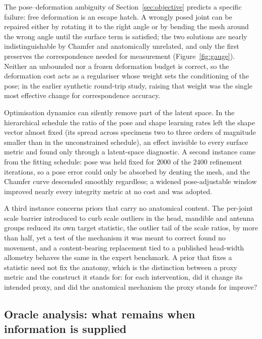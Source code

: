 The pose--deformation ambiguity of Section~\ref{sec:objective} predicts a specific
failure: free deformation is an escape hatch. A wrongly posed joint can be repaired
either by rotating it to the right angle or by bending the mesh around the wrong
angle until the surface term is satisfied; the two solutions are nearly
indistinguishable by Chamfer and anatomically unrelated, and only the first preserves
the correspondence needed for measurement (Figure~\ref{fig:gauge}). Neither an unbounded nor a frozen deformation budget is correct, so the
deformation cost acts as a regulariser whose weight sets the conditioning of the
pose; in the earlier synthetic round-trip study, raising that weight was the single most
effective change for correspondence accuracy.

Optimisation dynamics can silently remove part of the latent space. In the
hierarchical schedule the ratio of the pose and shape learning rates left the shape
vector almost fixed (its spread across specimens two to three orders of magnitude
smaller than in the unconstrained schedule), an effect invisible to every surface
metric and found only through a latent-space diagnostic. A second instance came from
the fitting schedule: pose was held fixed for $2000$ of the $2400$ refinement
iterations, so a pose error could only be absorbed by denting the mesh, and the
Chamfer curve descended smoothly regardless; a widened pose-adjustable window
improved nearly every integrity metric at no cost and was adopted.

A third instance concerns priors that carry no anatomical content. The per-joint scale
barrier introduced to curb scale outliers in the head, mandible and antenna groups
reduced its own target statistic, the outlier tail of the scale ratios, by more than
half, yet a test of the mechanism it was meant to correct found no movement, and a
content-bearing replacement tied to a published head-width allometry behaves the same
in the expert benchmark. A prior that fixes a statistic need not fix the anatomy, which
is the distinction between a proxy metric and the construct it stands for: for each
intervention, did it change its intended proxy, and did the anatomical mechanism the
proxy stands for improve?

\subsection{Oracle analysis: what remains when information is supplied}
\label{sec:oracle}

